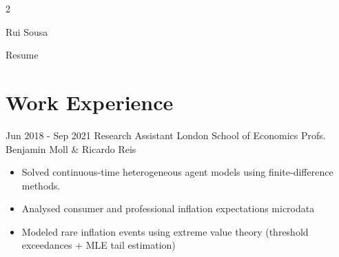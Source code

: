 \documentclass[
	10pt, %
]{FreemanCV}
\begin{document}
\begin{paracol}{2} %


\parbox[][0.11\textheight][c]{\linewidth}{ %
	\centering %
	
	{\sffamily\Huge Rui Sousa} %
	
	\medskip %
	
	{\cursivefont\Huge\textcolor{headings}{Resume}}
	
	\vfill %
}



\section{Work Experience}





\jobentry
	{Jun 2018 - Sep 2021} %
	{Research Assistant} %
	{London School of Economics} %
	{Profs. Benjamin Moll \& Ricardo Reis \vspace{-1.5em}} %
	{		\begin{itemize}[itemsep=-2pt]
			\item Solved continuous-time heterogeneous agent models using finite-difference methods.
			\item Analysed consumer and professional inflation expectations microdata
			\item Modeled rare inflation events using extreme value theory (threshold exceedances + MLE tail estimation)
		\end{itemize}} %


\end{paracol}
\end{document}
